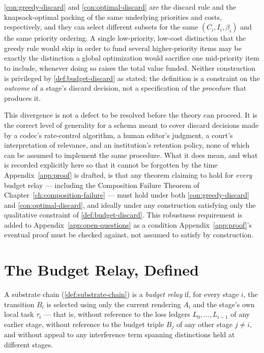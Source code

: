 \begin{remark}
\label{rem:discard-rules-diverge}
\cref{con:greedy-discard} and \cref{con:optimal-discard} are the discard
rule and the knapsack-optimal packing of the same underlying priorities and
costs, respectively, and they can select different subsets for the same
$(C_i, I_i, \beta_i)$ and the same priority ordering. A single
low-priority, low-cost distinction that the greedy rule would skip in
order to fund several higher-priority items may be exactly the distinction
a global optimization would sacrifice one mid-priority item to include,
whenever doing so raises the total value funded. Neither construction is
privileged by \cref{def:budget-discard} as stated; the definition is a
constraint on the \emph{outcome} of a stage's discard decision, not a
specification of the \emph{procedure} that produces it.
\end{remark}

This divergence is not a defect to be resolved before the theory can
proceed. It is the correct level of generality for a schema meant to cover
discard decisions made by a codec's rate-control algorithm, a human
editor's judgment, a court's interpretation of relevance, and an
institution's retention policy, none of which can be assumed to implement
the same procedure. What it does mean, and what is recorded explicitly
here so that it cannot be forgotten by the time Appendix~\ref{app:proof} is
drafted, is that any theorem claiming to hold for \emph{every} budget relay
--- including the Composition Failure Theorem of
Chapter~\ref{ch:composition-failure} --- must hold under both
\cref{con:greedy-discard} and \cref{con:optimal-discard}, and ideally under
any construction satisfying only the qualitative constraint of
\cref{def:budget-discard}. This robustness requirement is added to
Appendix~\ref{app:open-questions} as a condition Appendix~\ref{app:proof}'s
eventual proof must be checked against, not assumed to satisfy by
construction.

\section{The Budget Relay, Defined}

\begin{definition}
\label{def:budget-relay}
A substrate chain (\cref{def:substrate-chain}) is a \emph{budget relay} if,
for every stage $i$, the transition $B_i$ is selected using only the
current rendering $A_i$ and the stage's own local task $\tau_i$ --- that
is, without reference to the loss ledgers $L_0, \ldots, L_{i-1}$ of any
earlier stage, without reference to the budget triple $B_j$ of any other
stage $j \neq i$, and without appeal to any interference term spanning
distinctions held at different stages.
\end{definition}

